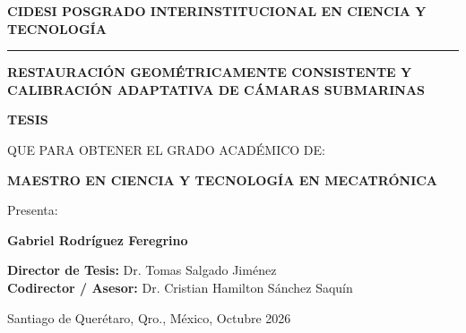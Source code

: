 \documentclass[12pt,letterpaper,spanish,twoside,openright]{report}
\begin{document}
\begin{titlepage}
\begin{singlespace}
\centering
\sffamily 

{\large\bfseries CIDESI \hfill POSGRADO INTERINSTITUCIONAL EN CIENCIA Y TECNOLOGÍA} \\
\rule{\textwidth}{1pt}

\vspace{2.0cm}

{\fontsize{24}{28}\selectfont\bfseries RESTAURACIÓN GEOMÉTRICAMENTE CONSISTENTE Y CALIBRACIÓN ADAPTATIVA DE CÁMARAS SUBMARINAS \par}

\vspace{1.5cm}

{\large\bfseries TESIS \par}
{\large QUE PARA OBTENER EL GRADO ACADÉMICO DE: \par}
\vspace{0.3cm}
{\large\bfseries MAESTRO EN CIENCIA Y TECNOLOGÍA EN MECATRÓNICA \par}

\vspace{1.5cm}

{\large Presenta: \par}
\vspace{0.3cm}
{\Large\bfseries Gabriel Rodríguez Feregrino \par}

\vfill

\begin{flushleft}
\large
\textbf{Director de Tesis:} Dr. Tomas Salgado Jiménez \\
\textbf{Codirector / Asesor:} Dr. Cristian Hamilton Sánchez Saquín
\end{flushleft}

\vspace{0.5cm}

{\large Santiago de Querétaro, Qro., México, Octubre 2026 \par}
\end{singlespace}
\end{titlepage}

%
%
%
%

\cleardoublepage
{}
\end{document}
